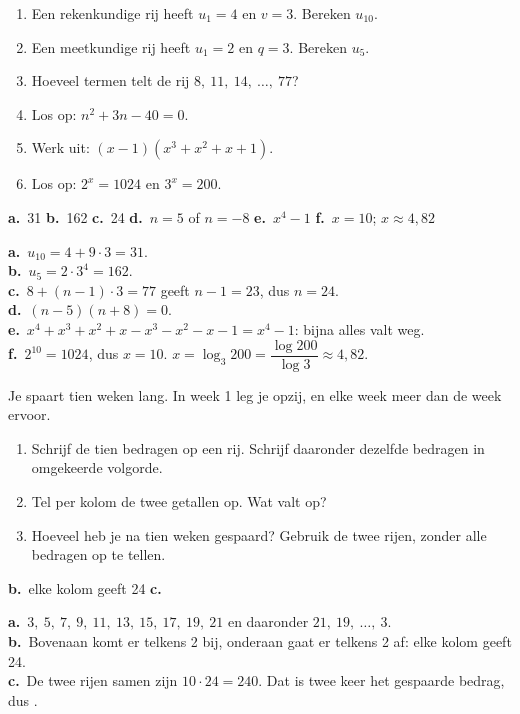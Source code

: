 \begin{oefeningen}[Start]
\begin{oefening}
\begin{enumerate}
  \item Een rekenkundige rij heeft $u_1 = 4$ en $v = 3$. Bereken $u_{10}$.
  \item Een meetkundige rij heeft $u_1 = 2$ en $q = 3$. Bereken $u_5$.
  \item Hoeveel termen telt de rij $8,\ 11,\ 14,\ \ldots,\ 77$?
  \item Los op: $n^2 + 3n - 40 = 0$.
  \item Werk uit: $(x-1)(x^3 + x^2 + x + 1)$.
  \item Los op: $2^x = 1024$ en $3^x = 200$.
\end{enumerate}
\begin{solution}
\textbf{a.}~31 \quad \textbf{b.}~162 \quad \textbf{c.}~24 \quad \textbf{d.}~$n=5$ of $n=-8$ \quad \textbf{e.}~$x^4-1$ \quad \textbf{f.}~$x=10$; $x\approx 4{,}82$
\end{solution}
\begin{fullsolution}
\textbf{a.}~$u_{10}=4+9\cdot 3=31$.\\
\textbf{b.}~$u_5=2\cdot 3^4=162$.\\
\textbf{c.}~$8+(n-1)\cdot 3=77$ geeft $n-1=23$, dus $n=24$.\\
\textbf{d.}~$(n-5)(n+8)=0$.\\
\textbf{e.}~$x^4+x^3+x^2+x-x^3-x^2-x-1=x^4-1$: bijna alles valt weg.\\
\textbf{f.}~$2^{10}=1024$, dus $x=10$. $x=\log_3 200=\dfrac{\log 200}{\log 3}\approx 4{,}82$.
\end{fullsolution}
\end{oefening}

\begin{oefening}\label{oef:h3-verken}
\quad Je spaart tien weken lang. In week 1 leg je  opzij, en elke week  meer dan de week ervoor.
\begin{enumerate}
  \item Schrijf de tien bedragen op een rij. Schrijf daaronder dezelfde bedragen in omgekeerde volgorde.
  \item Tel per kolom de twee getallen op. Wat valt op?
  \item Hoeveel heb je na tien weken gespaard? Gebruik de twee rijen, zonder alle bedragen op te tellen.
\end{enumerate}
\begin{solution}
\textbf{b.}~elke kolom geeft 24 \quad \textbf{c.}~
\end{solution}
\begin{fullsolution}
\textbf{a.}~$3,\ 5,\ 7,\ 9,\ 11,\ 13,\ 15,\ 17,\ 19,\ 21$ en daaronder $21,\ 19,\ \ldots,\ 3$.\\
\textbf{b.}~Bovenaan komt er telkens 2 bij, onderaan gaat er telkens 2 af: elke kolom geeft 24.\\
\textbf{c.}~De twee rijen samen zijn $10\cdot 24=240$. Dat is twee keer het gespaarde bedrag, dus .
\end{fullsolution}
\end{oefening}
\end{oefeningen}

